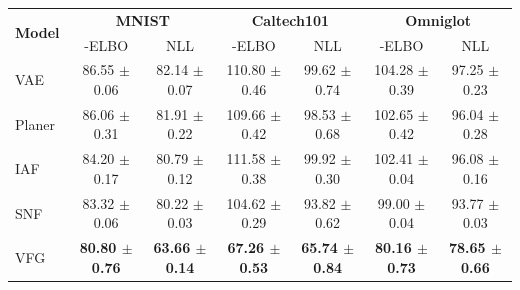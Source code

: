 \documentclass[twoside]{article}
\begin{document}
\begin{table}[h!t]
\centering
{\small
\label{tab:elbo}
\begin{tabular}{l | c  c   c  c  c  c }
\hline
 \multirow{2}{0nc}{\textbf{Model}} & \multicolumn{2}{c}{\textbf{MNIST}} & \multicolumn{2}{c}{\textbf{Caltech101}} & \multicolumn{2}{c}{\textbf{Omniglot}} \\
 & -ELBO & NLL  &  -ELBO & NLL  & -ELBO & NLL  \\
\hline
 VAE~\cite{kingma2013auto} & 86.55 $\pm$ 0.06  & 82.14 $\pm$ 0.07& 110.80 $\pm$ 0.46 & 99.62 $\pm$ 0.74 & 104.28 $\pm$ 0.39 & 97.25 $\pm$ 0.23 \\
Planer~\cite{rezende2015variational} & 86.06 $\pm$ 0.31 & 81.91 $\pm$ 0.22 & 109.66 $\pm$ 0.42 & 98.53 $\pm$ 0.68 & 102.65 $\pm$ 0.42 & 96.04 $\pm$ 0.28 \\
IAF~\cite{kingma2016improving} & 84.20 $\pm$ 0.17& 80.79 $\pm$ 0.12 & 111.58 $\pm$ 0.38 & 99.92 $\pm$ 0.30 & 102.41 $\pm$ 0.04 & 96.08 $\pm$ 0.16 \\
SNF~\cite{berg2018sylvester} & 83.32 $\pm$ 0.06 & 80.22 $\pm$ 0.03 & 104.62 $\pm$ 0.29 & 93.82 $\pm$ 0.62 & 99.00 $\pm$ 0.04 & 93.77 $\pm$ 0.03 \\
\hline
VFG &\textbf{80.80 $\pm$ 0.76} & \textbf{63.66 $\pm$ 0.14} & \textbf{67.26 $\pm$ 0.53} & \textbf{65.74 $\pm$ 0.84}  &\textbf{80.16 $\pm$ 0.73 } & \textbf{78.65 $\pm$ 0.66}\\  
\hline
\end{tabular}
}
\end{table}
\end{document}
